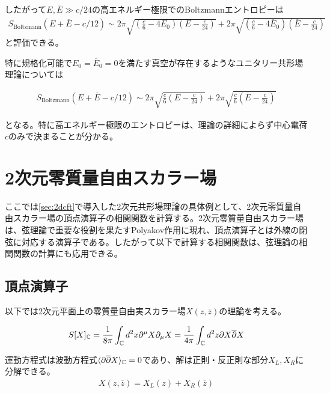 したがって$E,\overline{E}\gg c/24$の高エネルギー極限でのBoltzmannエントロピーは
\begin{align}
S_\text{Boltzmann}(E+\overline{E}-c/12)\sim 2\pi\sqrt{\left(\frac{c}{6}-4E_0\right)\left(E-\frac{c}{24}\right)}+2\pi\sqrt{\left(\frac{c}{6}-4\overline{E}_0\right)\left(\overline{E}-\frac{c}{24}\right)}
\end{align}
と評価できる。

特に規格化可能で$E_0=\overline{E}_0=0$を満たす真空が存在するようなユニタリー共形場理論については
\begin{oframed}
\begin{align}\label{cardyMCE}
S_\text{Boltzmann}(E+\overline{E}-c/12)\sim 2\pi\sqrt{\frac{c}{6}\left(E-\frac{c}{24}\right)}+2\pi\sqrt{\frac{c}{6}\left(\overline{E}-\frac{c}{24}\right)}
\end{align}
\end{oframed}
となる。特に高エネルギー極限のエントロピーは、理論の詳細によらず中心電荷$c$のみで決まることが分かる。


\section{2次元零質量自由スカラー場}\label{sec:2dscalar}
ここでは\ref{sec:2dcft}で導入した2次元共形場理論の具体例として、2次元零質量自由スカラー場の頂点演算子の相関関数を計算する。2次元零質量自由スカラー場は、弦理論で重要な役割を果たすPolyakov作用に現れ、頂点演算子とは外線の閉弦に対応する演算子である。したがって以下で計算する相関関数は、弦理論の相関関数の計算にも応用できる。

\subsection{頂点演算子}
以下では2次元平面上の零質量自由実スカラー場$X(z,\overline{z})$の理論を考える。
\begin{oframed}
\begin{align}
S[X]_{\mathbb{C}}=\frac{1}{8\pi}\int_{\mathbb{C}} d^2 x \partial^\mu X \partial_\mu X=\frac{1}{4\pi}\int_{\mathbb{C}} d^2 z \partial X \overline{\partial} X
\end{align}
\end{oframed}

運動方程式は波動方程式$\langle \partial\overline{\partial}X \rangle_{\mathbb{C}}=0$であり、解は正則・反正則な部分$X_L,X_R$に分解できる。
\begin{align}
X(z,\overline{z})=X_L(z)+X_R(\overline{z})
\end{align}

